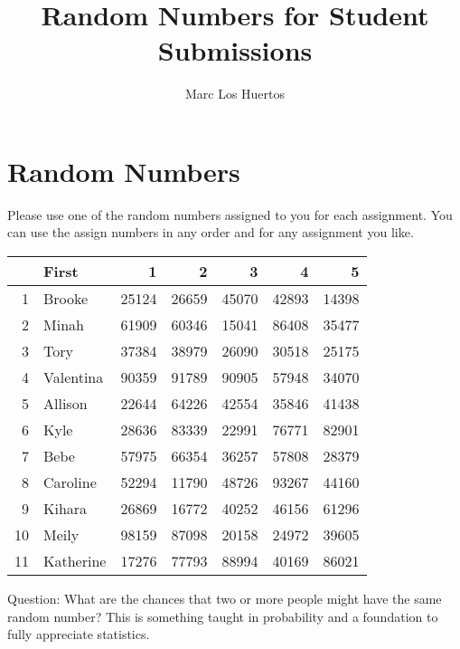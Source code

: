 \documentclass{article}\usepackage[]{graphicx}\usepackage[]{color}
\title{Random Numbers for Student Submissions}
\author{Marc Los Huertos}
\begin{document}
\maketitle


\section*{Random Numbers}

Please use one of the random numbers assigned to you for each assignment. You can use the assign numbers in any order and for any assignment you like. 

\begin{table}[ht]
\centering
\begin{tabular}{rlrrrrr}
  \hline
 & First & 1 & 2 & 3 & 4 & 5 \\ 
  \hline
1 & Brooke & 25124 & 26659 & 45070 & 42893 & 14398 \\ 
  2 & Minah & 61909 & 60346 & 15041 & 86408 & 35477 \\ 
  3 & Tory & 37384 & 38979 & 26090 & 30518 & 25175 \\ 
  4 & Valentina & 90359 & 91789 & 90905 & 57948 & 34070 \\ 
  5 & Allison & 22644 & 64226 & 42554 & 35846 & 41438 \\ 
  6 & Kyle & 28636 & 83339 & 22991 & 76771 & 82901 \\ 
  7 & Bebe & 57975 & 66354 & 36257 & 57808 & 28379 \\ 
  8 & Caroline & 52294 & 11790 & 48726 & 93267 & 44160 \\ 
  9 & Kihara & 26869 & 16772 & 40252 & 46156 & 61296 \\ 
  10 & Meily & 98159 & 87098 & 20158 & 24972 & 39605 \\ 
  11 & Katherine & 17276 & 77793 & 88994 & 40169 & 86021 \\ 
   \hline
\end{tabular}
\end{table}


Question: What are the chances that two or more people might have the same random number?  This is something taught in probability and a foundation to fully appreciate statistics.
\end{document}
